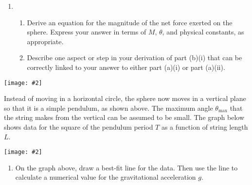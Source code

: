\documentclass[11pt]{article}
\newcommand{\pic}[2]{
  \begin{center}\texttt{[image: \#2]}\end{center}
}
\begin{document}
\begin{enumerate}
\begin{enumerate}
  \item
    \begin{enumerate}
    \item Derive an equation for the magnitude of the net force exerted on
      the sphere. Express your answer in terms of $M$, $\theta$, and physical
      constants, as appropriate.
    \item Describe one aspect or step in your derivation of part (b)(i) that
      can be correctly linked to your answer to either part (a)(i) or part
      (a)(ii).
    \end{enumerate}
  \end{enumerate}
  \newpage

  \pic{.3}{swing-backandforth}
  Instead of moving in a horizontal circle, the sphere now moves in a vertical
  plane so that it is a simple pendulum, as shown above. The maximum angle
  $\theta_\mathrm{max}$ that the string makes from the vertical can be assumed
  to be small. The graph below shows data for the square of the pendulum period
  $T$ as a function of string length $L$.

  \pic{.5}{T2-L}
  \begin{enumerate}[resume]
  \item On the graph above, draw a best-fit line for the data. Then use the
    line to calculate a numerical value for the gravitational acceleration $g$.
    \newpage


\end{enumerate}
\end{enumerate}
\end{document}
